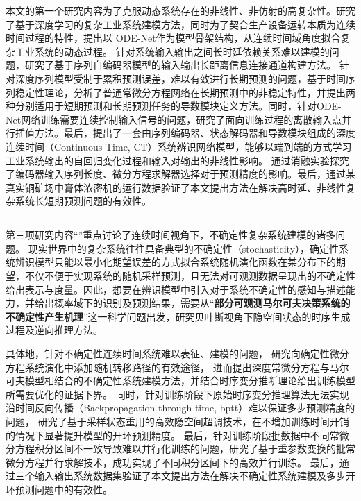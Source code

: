 本文的第一个研究内容为了克服动态系统存在的非线性、非仿射的高复杂性。研究了基于深度学习的复杂工业系统建模方法，同时为了契合生产设备运转本质为连续时间过程的特性，提出以
ODE-Net作为模型骨架结构，从连续时间域角度拟合复杂工业系统的动态过程。
针对系统输入输出之间长时延依赖关系难以建模的问题，研究了基于序列自编码器模型的输入输出长距离信息连接通道构建方法。
针对深度序列模型受制于累积预测误差，难以有效进行长期预测的问题，基于时间序列稳定性理论，分析了普通常微分方程网络在长期预测中的非稳定特性，并提出两种分别适用于短期预测和长期预测任务的导数模块定义方法。同时，针对ODE-Net网络训练需要连续控制输入信号的问题，研究了面向训练过程的离散输入点并行插值方法。最后，提出了一套由序列编码器、状态解码器和导数模块组成的深度连续时间（Continuous Time, CT）系统辨识网络模型，能够以端到端的方式学习工业系统输出的自回归变化过程和输入对输出的非线性影响。
通过消融实验探究了编码器输入序列长度、微分方程求解器选择对于预测精度的影响。最后，通过某真实铜矿场中膏体浓密机的运行数据验证了本文提出方法在解决高时延、非线性复杂系统长短期预测问题的有效性。






\subsection{\TitlechapterII}

第三项研究内容“\TitlechapterII”重点讨论了连续时间视角下，不确定性复杂系统建模的诸多问题。
现实世界中的复杂系统往往具备典型的不确定性（stochasticity），确定性系统辨识模型只能以最小化期望误差的方式拟合系统随机演化函数在某分布下的期望，不仅不便于实现系统的随机采样预测，且无法对可观测数据呈现出的不确定性给出表示与度量。因此，想要在辨识模型中引入对于系统不确定性的感知与描述能力，并给出概率域下的识别及预测结果，需要从“\textbf{部分可观测马尔可夫决策系统的不确定性产生机理}”这一科学问题出发，研究贝叶斯视角下隐空间状态的时序生成过程及逆向推理方法。

具体地，针对不确定性连续时间系统难以表征、建模的问题，
研究向确定性微分方程系统演化中添加随机转移路径的有效途径，
进而提出深度常微分方程与马尔可夫模型相结合的不确定性系统建模方法，并结合时序变分推断理论给出训练模型所需要优化的证据下界。
同时，针对训练阶段下原始时序变分推理算法无法实现沿时间反向传播（Backpropagation through time, bptt）难以保证多步预测精度的问题，
研究了基于采样状态重用的高效隐空间超调技术，在不增加训练时间开销的情况下显著提升模型的开环预测精度。
最后，针对训练阶段批数据中不同常微分方程积分区间不一致导致难以并行化训练的问题，研究了基于重参数变换的批常微分方程并行求解技术，成功实现了不同积分区间下的高效并行训练。
最后，通过三个输入输出系统数据集验证了本文提出方法在解决不确定性系统建模及多步开环预测问题中的有效性。


